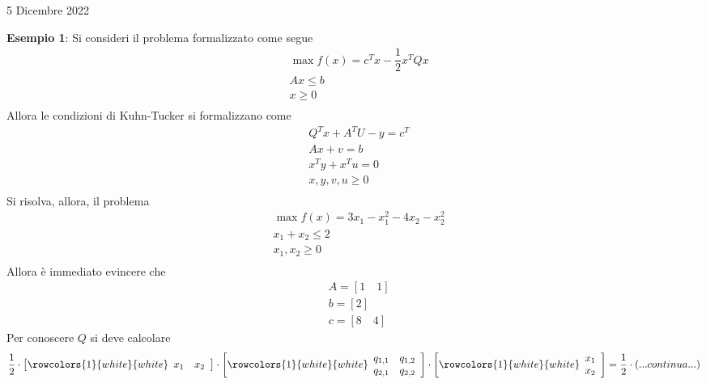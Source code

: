 \documentclass[a4paper]{extarticle}
\begin{document}
\newpage
\begin{center}
    5 Dicembre 2022
\end{center}
\vspace{1em}
\noindent
\textbf{Esempio 1}: Si consideri il problema formalizzato come segue
\begin{align*}
    & \max f(x) = c{^T} x - \dfrac{1}{2} x{^T} Q x\\
    & Ax \leq b\\
    & x \geq 0\\
\end{align*}
Allora le condizioni di Kuhn-Tucker si formalizzano come
\begin{align*}
    &Q^T x + A^T U - y = c{^T}\\
    & Ax + v = b\\
    &x{^T} y + x{^T} u = 0\\
    &x,y,v,u \geq 0\\
\end{align*}
Si risolva, allora, il problema
\begin{align*}
    & \max f(x) = 3x_1 - x_1^2 - 4x_2 - x_2^2\\
    & x_1+x_2 \leq 2\\
    & x_1,x_2 \geq 0\\
\end{align*}
Allora è immediato evincere che
\begin{align*}
    &A=\left[1 \hspace{1em} 1\right]\\
    &b=\left[2\right]\\
    &c=\left[8 \hspace{1em} 4\right]
\end{align*}
Per conoscere $Q$ si deve calcolare
\[\dfrac{1}{2} \cdot \left[
    \rowcolors{1}{white}{white}
    \begin{array}{cc}
        x_1 & x_2\\
    \end{array}
\right] \cdot \left[
    \rowcolors{1}{white}{white}
    \begin{array}{cc}
        q_{1,1} & q_{1,2}\\
        q_{2,1} & q_{2,2}\\
    \end{array}
\right] \cdot \left[
    \rowcolors{1}{white}{white}
    \begin{array}{cc}
        x_1\\
        x_2
    \end{array}
\right] = \dfrac{1}{2} \cdot \left(...continua...\right)\]
\end{document}

